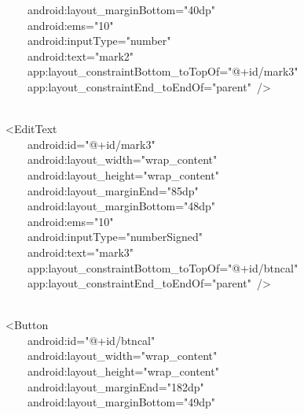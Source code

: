 {\ttfamily\small \ \ \ \ \ \ \ \ android:layout\_marginBottom="40dp"} \\
{\ttfamily\small \ \ \ \ \ \ \ \ android:ems="10"} \\
{\ttfamily\small \ \ \ \ \ \ \ \ android:inputType="number"} \\
{\ttfamily\small \ \ \ \ \ \ \ \ android:text="mark2"} \\
{\ttfamily\small \ \ \ \ \ \ \ \ app:layout\_constraintBottom\_toTopOf="@+id/mark3"} \\
{\ttfamily\small \ \ \ \ \ \ \ \ app:layout\_constraintEnd\_toEndOf="parent"\ /\textgreater{}} \\
\strut \\
{\ttfamily\small \ \ \ \ \textless{}EditText} \\
{\ttfamily\small \ \ \ \ \ \ \ \ android:id="@+id/mark3"} \\
{\ttfamily\small \ \ \ \ \ \ \ \ android:layout\_width="wrap\_content"} \\
{\ttfamily\small \ \ \ \ \ \ \ \ android:layout\_height="wrap\_content"} \\
{\ttfamily\small \ \ \ \ \ \ \ \ android:layout\_marginEnd="85dp"} \\
{\ttfamily\small \ \ \ \ \ \ \ \ android:layout\_marginBottom="48dp"} \\
{\ttfamily\small \ \ \ \ \ \ \ \ android:ems="10"} \\
{\ttfamily\small \ \ \ \ \ \ \ \ android:inputType="numberSigned"} \\
{\ttfamily\small \ \ \ \ \ \ \ \ android:text="mark3"} \\
{\ttfamily\small \ \ \ \ \ \ \ \ app:layout\_constraintBottom\_toTopOf="@+id/btncal"} \\
{\ttfamily\small \ \ \ \ \ \ \ \ app:layout\_constraintEnd\_toEndOf="parent"\ /\textgreater{}} \\
\strut \\
{\ttfamily\small \ \ \ \ \textless{}Button} \\
{\ttfamily\small \ \ \ \ \ \ \ \ android:id="@+id/btncal"} \\
{\ttfamily\small \ \ \ \ \ \ \ \ android:layout\_width="wrap\_content"} \\
{\ttfamily\small \ \ \ \ \ \ \ \ android:layout\_height="wrap\_content"} \\
{\ttfamily\small \ \ \ \ \ \ \ \ android:layout\_marginEnd="182dp"} \\
{\ttfamily\small \ \ \ \ \ \ \ \ android:layout\_marginBottom="49dp"} \\
